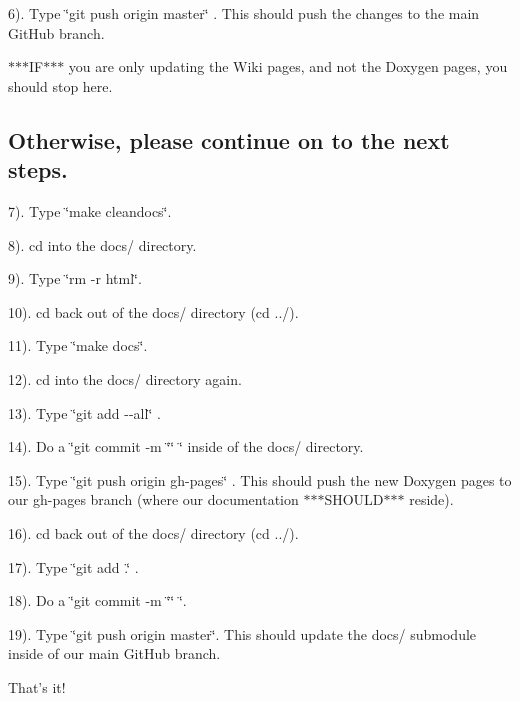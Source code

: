 6). Type \char`\"{}git push origin master\char`\"{} . This should push the changes to the main Git\-Hub branch. 

 $\ast$$\ast$$\ast$\-I\-F$\ast$$\ast$$\ast$ you are only updating the Wiki pages, and not the Doxygen pages, you should stop here.

\subsection*{Otherwise, please continue on to the next steps. }

7). Type \char`\"{}make cleandocs\char`\"{}.

8). cd into the docs/ directory.

9). Type \char`\"{}rm -\/r html\char`\"{}.

10). cd back out of the docs/ directory (cd ../).

11). Type \char`\"{}make docs\char`\"{}.

12). cd into the docs/ directory again.

13). Type \char`\"{}git add -\/-\/all\char`\"{} .

14). Do a \char`\"{}git commit -\/m \char`\"{}\char`\"{} \char`\"{} inside of the docs/ directory.

15). Type \char`\"{}git push origin gh-\/pages\char`\"{} . This should push the new Doxygen pages to our gh-\/pages branch (where our documentation $\ast$$\ast$$\ast$\-S\-H\-O\-U\-L\-D$\ast$$\ast$$\ast$ reside).

16). cd back out of the docs/ directory (cd ../).

17). Type \char`\"{}git add .\char`\"{} .

18). Do a \char`\"{}git commit -\/m \char`\"{}\char`\"{} \char`\"{}.

19). Type \char`\"{}git push origin master\char`\"{}. This should update the docs/ submodule inside of our main Git\-Hub branch.

That's it! 
